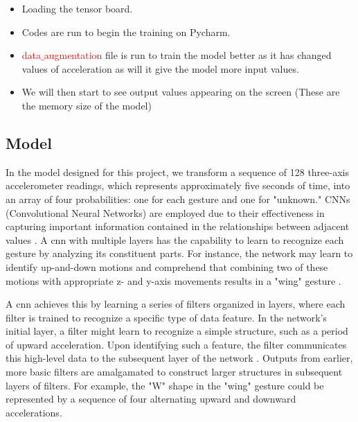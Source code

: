 \begin{itemize}
    
    \item Loading the tensor board.
    
    \item Codes are run to begin the training on Pycharm.
    
    \item \textcolor{red}{data$\_$augmentation} file is run to train the model better as it has changed values of acceleration as will it give the model more input values.
    
    \item We will then start to see output values appearing on the screen (These are the memory size of the model)
    
\end{itemize}

\subsection{Model}

In the model designed for this project, we transform a sequence of 128 three-axis accelerometer readings, which represents approximately five seconds of time, into an array of four probabilities: one for each gesture and one for "unknown." CNNs (Convolutional Neural Networks) are employed due to their effectiveness in capturing important information contained in the relationships between adjacent values \cite{Warden:2020}  . A \ac{cnn} with multiple layers has the capability to learn to recognize each gesture by analyzing its constituent parts. For instance, the network may learn to identify up-and-down motions and comprehend that combining two of these motions with appropriate z- and y-axis movements results in a "wing" gesture \cite{Warden:2020}.

A \ac{cnn} achieves this by learning a series of filters organized in layers, where each filter is trained to recognize a specific type of data feature. In the network's initial layer, a filter might learn to recognize a simple structure, such as a period of upward acceleration. Upon identifying such a feature, the filter communicates this high-level data to the subsequent layer of the network \cite{Warden:2020}. Outputs from earlier, more basic filters are amalgamated to construct larger structures in subsequent layers of filters. For example, the "W" shape in the "wing" gesture could be represented by a sequence of four alternating upward and downward accelerations.

